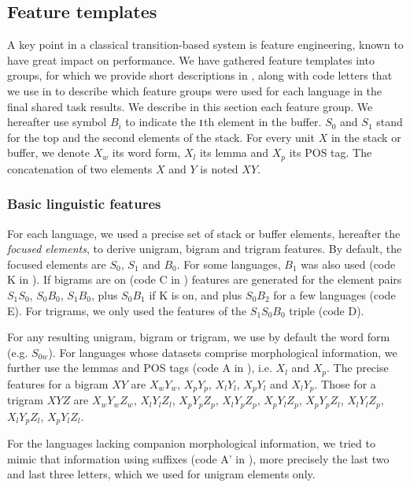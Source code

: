 \documentclass[output=paper,modfonts]{langscibook}
\begin{document}
\subsection{Feature templates}
\label{ss:features}
A key point in a classical transition-based system is feature engineering, known to have great impact on performance. 
We have gathered feature templates into groups, for which we provide short descriptions in , along with code letters that we use in  to describe which feature groups were used for each language in the final shared task results. We describe in this section each feature group. We hereafter use symbol $B_i$ to indicate the $\textsc{i}$th element in the buffer. $S_0$ and $S_1$ stand for the top and the second elements of the stack. For every unit $X$ in the stack or buffer, we denote $X_w$ its word form, $X_l$ its lemma and $X_p$ its POS tag. The concatenation of two elements $X$ and $Y$ is noted $XY$. 
\subsubsection*{Basic linguistic features}
For each language, we used a precise set of stack or buffer elements, hereafter the {\em focused elements}, to derive unigram, bigram and trigram features. By default, the focused elements are $S_0$, $S_1$ and $B_0$. For some languages, $B_1$ was also used (code K in ). If bigrams are on (code C in ) features are generated for the element pairs $S_1 S_0$, $S_0B_0$, $S_1B_0$, plus $S_0B_1$ if K is on, and plus $S_0B_2$ for a few languages (code E). For trigrams, we only used the features of the $S_1S_0B_0$ triple (code D).

For any resulting unigram, bigram or trigram, we use by default the word form (e.g. $S_{0w}$). For languages whose datasets comprise morphological information, we further use the lemmas and POS tags (code A in ), i.e. $X_l$ and $X_p$. The precise features for a bigram $XY$ are $X_wY_w$, $X_pY_p$, $X_lY_l$, $X_pY_l$ and $X_lY_p$. Those for a trigram $XYZ$ are $X_wY_wZ_w$, $X_lY_lZ_l$, $X_pY_pZ_p$, $X_lY_pZ_p$, $X_pY_lZ_p$, $X_pY_pZ_l$, $X_lY_lZ_p$, $X_lY_pZ_l$, $X_pY_lZ_l$.

For the languages lacking companion morphological information, we tried to mimic that information using suffixes (code A' in ), more precisely the last two and last three letters, which we used for unigram elements only.
\end{document}
